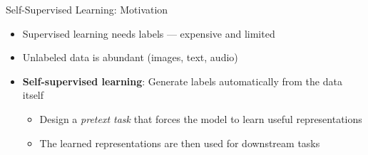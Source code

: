 \documentclass[11pt]{beamer}
\begin{document}
\begin{frame}{Self-Supervised Learning: Motivation}
    \begin{itemize}
        \item Supervised learning needs labels — expensive and limited
        \item Unlabeled data is abundant (images, text, audio)
        \item \textbf{Self-supervised learning}: Generate labels automatically from the data itself
            \begin{itemize}
                \item Design a \emph{pretext task} that forces the model to learn useful representations
                \item The learned representations are then used for downstream tasks
            \end{itemize}
    \end{itemize}
    \vfill
    \centering
\end{frame}
\end{document}
